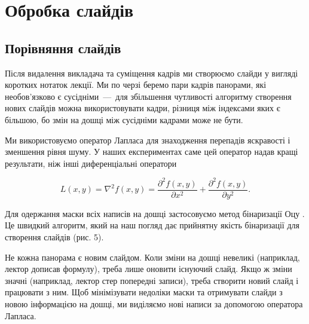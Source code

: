 \section{Обробка слайдів}

\subsection{Порівняння слайдів}

Після видалення викладача та суміщення кадрів ми створюємо слайди у вигляді
коротких нотаток лекції. Ми по черзі беремо пари кадрів панорами, які
необов'язково є сусідніми~---~для збільшення чутливості алгоритму створення нових
слайдів можна використовувати кадри, різниця між індексами яких є більшою, бо
змін на дошці між сусідніми кадрами може не бути.

Ми використовуємо оператор Лапласа  для знаходження перепадів
яскравості і зменшення рівня шуму. У наших експериментах саме цей
оператор надав кращі результати, ніж інші диференціальні оператори

\begin{equation*}
  L(x,y) = \nabla^{2}f(x,y) = \frac{\partial^{2}f(x,y)}{\partial x^{2}} + \frac{\partial^{2}f(x,y)}{\partial y^{2}}.
\end{equation*}

Для одержання маски всіх написів на дошці застосовуємо метод бінаризації
Оцу . Це швидкий алгоритм, який на наш погляд дає прийнятну
якість бінаризації для створення слайдів (рис. 5).

Не кожна панорама є новим слайдом. Коли зміни на дошці невеликі
(наприклад, лектор дописав формулу), треба лише оновити існуючий слайд.
Якщо ж зміни значні (наприклад, лектор стер попередні записи), треба
створити новий слайд і працювати з ним. Щоб мінімізувати недоліки маски
та отримувати слайди з новою інформацією на дошці, ми виділяємо нові
написи за допомогою оператора Лапласа.

